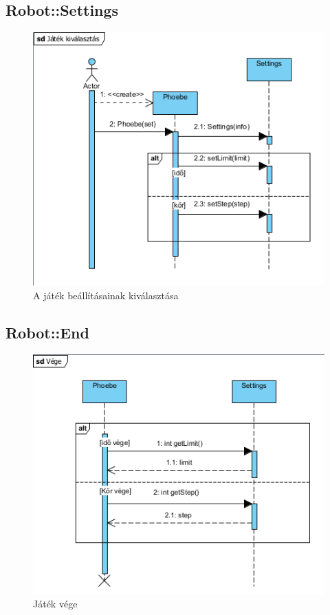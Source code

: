 \subsection{Robot::Settings}
\begin{figure}[h]
\begin{center}
\includegraphics[width=17cm]{images/kivalasztas.PNG}
\caption{A játék beállításainak kiválasztása}
\label{fig:example10}
\end{center}
\end{figure}
\pagebreak

\subsection{Robot::End}
\begin{figure}[h]
\begin{center}
\includegraphics[width=17cm]{images/end.PNG}
\caption{Játék vége}
\label{fig:example11}
\end{center}
\end{figure}
\pagebreak

